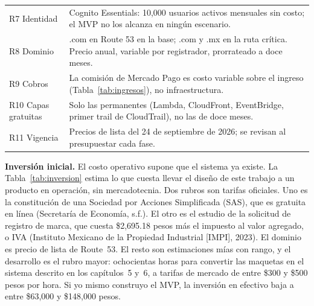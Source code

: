 \documentclass[12pt, a4paper]{article}
\begin{document}
\begin{table}[!ht]
\begin{tabularx}{\textwidth}{l X}
    R7 Identidad & Cognito Essentials: 10,000 usuarios activos mensuales sin costo; el MVP no los alcanza en ningún escenario. \\
    R8 Dominio & .com en Route 53 en la base; .com y .mx en la ruta crítica. Precio anual, variable por registrador, prorrateado a doce meses. \\
    R9 Cobros & La comisión de Mercado Pago es costo variable sobre el ingreso (Tabla~\ref{tab:ingresos}), no infraestructura. \\
    R10 Capas gratuitas & Solo las permanentes (Lambda, CloudFront, EventBridge, primer trail de CloudTrail), no las de doce meses. \\
    R11 Vigencia & Precios de lista del 24 de septiembre de 2026; se revisan al presupuestar cada fase. \\
    \bottomrule
  \end{tabularx}
\end{table}
 
\textbf{Inversión inicial.} El costo operativo supone que el sistema ya
existe. La Tabla~\ref{tab:inversion} estima lo que cuesta llevar el
diseño de este trabajo a un producto en operación, sin mercadotecnia.
Dos rubros son tarifas oficiales. Uno es la constitución de una Sociedad
por Acciones Simplificada (SAS), que es gratuita en línea (Secretaría de
Economía, s.f.). El otro es el estudio de la solicitud de registro de
marca, que cuesta \$2,695.18 pesos más el impuesto al valor agregado, o
IVA (Instituto Mexicano de la Propiedad Industrial [IMPI], 2023). El
dominio es precio de lista de Route~53. El resto son estimaciones mías
con rango, y el desarrollo es el rubro mayor: ochocientas horas
para convertir las maquetas en el sistema descrito en los capítulos~5
y~6, a tarifas de mercado de entre \$300 y \$500 pesos por hora. Si yo
mismo construyo el MVP, la inversión en efectivo baja a entre
\$63,000 y \$148,000 pesos.
 
\end{document}
